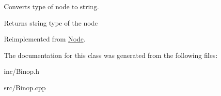 Converts type of node to string. 

\begin{DoxyReturn}{Returns}
string type of the node 
\end{DoxyReturn}


Reimplemented from \hyperlink{classNode_abce0a9ddac6a5e2c0e546dbe6af02e3d}{Node}.



The documentation for this class was generated from the following files\+:\begin{DoxyCompactItemize}
\item 
inc/Binop.\+h\item 
src/Binop.\+cpp\end{DoxyCompactItemize}
